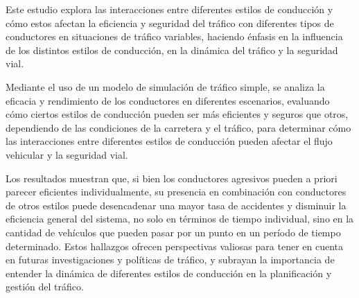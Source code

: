 Este estudio explora las interacciones entre diferentes estilos de conducción y cómo estos afectan la eficiencia y seguridad del tráfico con
diferentes tipos de conductores en situaciones de tráfico variables, haciendo énfasis en la influencia de los distintos estilos de conducción,
en la dinámica del tráfico y la seguridad vial.

Mediante el uso de un modelo de simulación de tráfico simple, se analiza la eficacia y rendimiento de los conductores en diferentes escenarios,
evaluando cómo ciertos estilos de conducción pueden ser más eficientes y seguros que otros, dependiendo de las condiciones de la carretera y el tráfico,
para determinar cómo las interacciones entre diferentes estilos de conducción pueden afectar el flujo vehicular y la seguridad vial.

Los resultados muestran que, si bien los conductores agresivos pueden a priori parecer eficientes individualmente, su presencia
en combinación con conductores de otros estilos puede desencadenar una mayor tasa de accidentes y disminuir la eficiencia general del sistema,
no solo en términos de tiempo individual, sino en la cantidad de vehículos que pueden pasar por un punto en un período de tiempo determinado.
Estos hallazgos ofrecen perspectivas valiosas para tener en cuenta en futuras investigaciones y políticas de tráfico,
y subrayan la importancia de entender la dinámica de diferentes estilos de conducción en la planificación y gestión del tráfico.